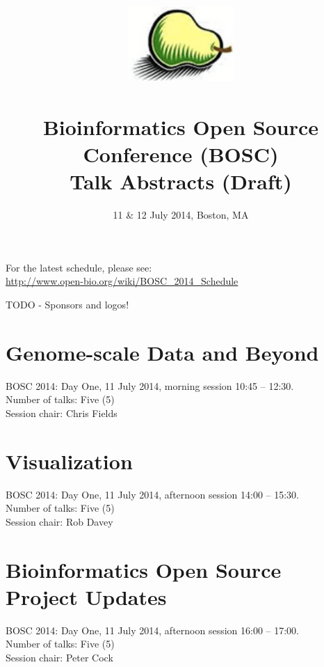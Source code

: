 \documentclass[10pt,oneside]{article}
\title{%
\vspace{4cm}
\includegraphics[width=4cm]{../../logos/100px-Pear.png}\\
~\\Bioinformatics Open Source Conference (BOSC)\\
Talk Abstracts (Draft)}
\date{11 \& 12 July 2014, Boston, MA}
\begin{document}
\pagestyle{empty}
\maketitle

\noindent For the latest schedule, please see:\\
\url{http://www.open-bio.org/wiki/BOSC_2014_Schedule}

TODO - Sponsors and logos!

\thispagestyle{empty}

\newpage
\section*{Genome-scale Data and Beyond}
BOSC 2014: Day One, 11 July 2014, morning session 10:45 -- 12:30. \\
\noindent Number of talks: Five (5) \\
\noindent Session chair: Chris Fields






\newpage
\section*{Visualization}
BOSC 2014: Day One, 11 July 2014, afternoon session 14:00 -- 15:30. \\
\noindent Number of talks: Five (5) \\
\noindent Session chair: Rob Davey 






\newpage
\section*{Bioinformatics Open Source Project Updates}
BOSC 2014: Day One, 11 July 2014, afternoon session 16:00 -- 17:00. \\
\noindent Number of talks: Five (5) \\
\noindent Session chair: Peter Cock 





\end{document}
